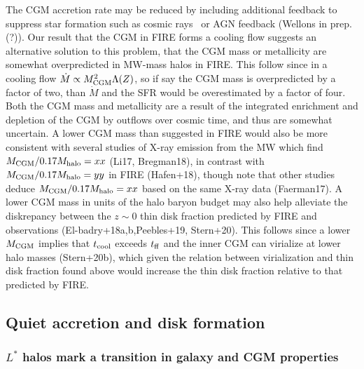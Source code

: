\documentclass[fleqn,usenatbib]{mnras}
\newcommand{\Mdot}{\dot{M}}
\begin{document}
The CGM accretion rate may be reduced by including additional feedback to suppress star formation such as cosmic rays~\citep{Chan2019, Hopkins2020, Hopkins2020a, Hopkins2020b}
or AGN feedback (Wellons in prep.(?)). 
Our result that the CGM in FIRE forms a cooling flow suggests an alternative solution to this problem, that the CGM mass or metallicity are somewhat overpredicted in MW-mass halos in FIRE.
This follow since in a cooling flow $\Mdot\propto M_{\rm CGM}^2 \Lambda(Z)$, so if say the CGM mass is overpredicted by a factor of two, than $\Mdot$ and the SFR would be overestimated by a factor of four.
Both the CGM mass and metallicity are a result of the integrated enrichment and depletion of the CGM by outflows over cosmic time, and thus are somewhat uncertain. %
A lower CGM mass than suggested in FIRE would also be more consistent with several studies of X-ray emission from the MW which find $M_{\rm CGM}/0.17M_{\rm halo}=xx$ (Li17, Bregman18), in contrast with $M_{\rm CGM}/0.17M_{\rm halo}=yy$ in FIRE (Hafen+18), though note that other studies deduce $M_{\rm CGM}/0.17M_{\rm halo}=xx$ based on the same X-ray data (Faerman17).
A lower CGM mass in units of the halo baryon budget may also help alleviate the diskrepancy between the $z\sim0$ thin disk fraction predicted by FIRE and observations (El-badry+18a,b,Peebles+19, Stern+20).
This follows since a lower $M_{\rm CGM}$ implies that $t_{\rm cool}$ exceeds $t_{\rm ff}$ and the inner CGM can virialize at lower halo masses (Stern+20b), which given the relation between virialization and thin disk fraction found above would increase the thin disk fraction relative to that predicted by FIRE. 

\subsection{Quiet accretion and disk formation}
\label{s: disk formation}

\subsubsection{$L^*$ halos mark a transition in galaxy and CGM properties}
\label{s: disk formation -- transition}
\end{document}
